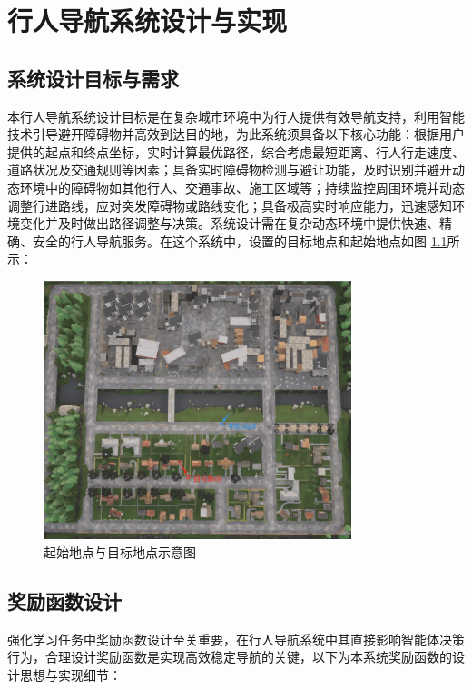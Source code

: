 	\chapter{行人导航系统设计与实现}
	
	\section{系统设计目标与需求}
	
	本行人导航系统设计目标是在复杂城市环境中为行人提供有效导航支持，利用智能技术引导避开障碍物并高效到达目的地，为此系统须具备以下核心功能：根据用户提供的起点和终点坐标，实时计算最优路径，综合考虑最短距离、行人行走速度、道路状况及交通规则等因素；具备实时障碍物检测与避让功能，及时识别并避开动态环境中的障碍物如其他行人、交通事故、施工区域等；持续监控周围环境并动态调整行进路线，应对突发障碍物或路线变化；具备极高实时响应能力，迅速感知环境变化并及时做出路径调整与决策。系统设计需在复杂动态环境中提供快速、精确、安全的行人导航服务。在这个系统中，设置的目标地点和起始地点如图 \ref{fig:location}所示：
	
	\begin{figure}[H]
	    \centering
	    \includegraphics[width=0.8\textwidth]{images/location_select.pdf}
	    \caption{起始地点与目标地点示意图}
	    \label{fig:location}
	\end{figure}
	
	\section{奖励函数设计}
	
	强化学习任务中奖励函数设计至关重要，在行人导航系统中其直接影响智能体决策行为，合理设计奖励函数是实现高效稳定导航的关键，以下为本系统奖励函数的设计思想与实现细节：
	
